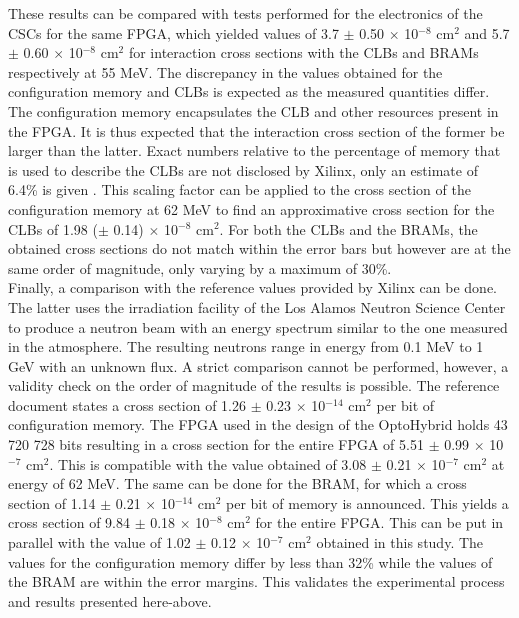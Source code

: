       These results can be compared with tests performed for the electronics of the CSCs \cite{Bylsma2013242} for the same FPGA, which yielded values of 3.7 $\pm$ 0.50 $ \times $ 10$^{-8}$ cm$^2$ and 5.7 $\pm$ 0.60 $ \times $ 10$^{-8}$ cm$^2$ for interaction cross sections with the CLBs and BRAMs respectively at 55 MeV. The discrepancy in the values obtained for the configuration memory and CLBs is expected as the measured quantities differ. The configuration memory encapsulates the CLB and other resources present in the FPGA. It is thus expected that the interaction cross section of the former be larger than the latter. Exact numbers relative to the percentage of memory that is used to describe the CLBs are not disclosed by Xilinx, only an estimate of 6.4\% is given \cite{XILINX-SEM}. This scaling factor can be applied to the cross section of the configuration memory at 62 MeV to find an approximative cross section for the CLBs of 1.98 ($\pm$ 0.14) $\times$ 10$^{-8}$ cm$^2$. For both the CLBs and the BRAMs, the obtained cross sections do not match within the error bars but however are at the same order of magnitude, only varying by a maximum of 30\%. \\

      Finally, a comparison with the reference values provided by Xilinx \cite{XILINX-RELAIBILITY} can be done. The latter uses the irradiation facility of the Los Alamos Neutron Science Center to produce a neutron beam with an energy spectrum similar to the one measured in the atmosphere. The resulting neutrons range in energy from 0.1 MeV to 1 GeV with an unknown flux. A strict comparison cannot be performed, however, a validity check on the order of magnitude of the results is possible. The reference document states a cross section of 1.26 $\pm$ 0.23 $\times$ 10$^{-14}$ cm$^2$ per bit of configuration memory. The FPGA used in the design of the OptoHybrid holds 43 720 728 bits resulting in a cross section for the entire FPGA of 5.51 $\pm$ 0.99 $\times$ 10$^{-7}$ cm$^2$. This is compatible with the value obtained of 3.08 $\pm$ 0.21 $ \times $ 10$^{-7}$ cm$^2$ at energy of 62 MeV. The same can be done for the BRAM, for which a cross section of 1.14 $\pm$ 0.21 $ \times $ 10$^{-14}$ cm$^2$ per bit of memory is announced. This yields a cross section of 9.84 $\pm$ 0.18 $\times$ 10$^{-8}$ cm$^2$ for the entire FPGA. This can be put in parallel with the value of 1.02 $\pm$ 0.12 $ \times $ 10$^{-7}$ cm$^2$ obtained in this study. The values for the configuration memory differ by less than 32\% while the values of the BRAM are within the error margins. This validates the experimental process and results presented here-above.

